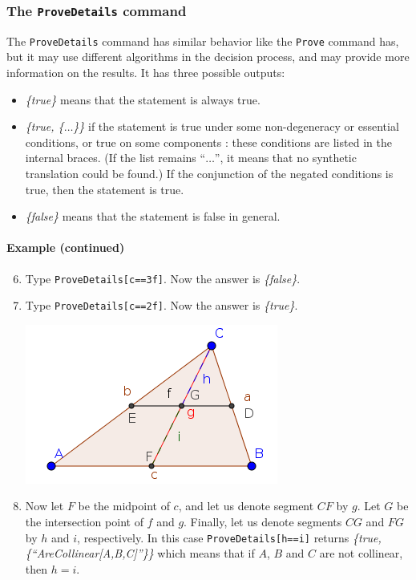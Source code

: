 \documentclass{article}
\begin{document}
\subsubsection{The \texttt{ProveDetails} command}
The \texttt{ProveDetails} command has similar behavior like the \texttt{Prove} command has, but it may use different algorithms in the decision process, and may provide more information on the results. It has three possible outputs:
\begin{itemize}
    \item \textit{\{true\}} means that the statement is always true.
    \item \textit{\{true, \{$\ldots$\}\}} if the statement is true under some non-degeneracy \cite{Chou} or essential \cite{KovacsRecioSolyomGecse} conditions, or true on some components \cite{ZhouWangSun}: these conditions are listed in the internal braces. (If the list remains ``$\ldots$'', it means that no synthetic translation could be found.)  If the conjunction of the negated conditions is true, then the statement is true.
    \item \textit{\{false\}} means that the statement is false in general.
\end{itemize}
\paragraph{Example (continued)}
\begin{enumerate}
\setcounter{enumi}{5}
    \item Type \texttt{ProveDetails[c==3f]}. Now the answer is \textit{\{false\}}.
    \item Type \texttt{ProveDetails[c==2f]}. Now the answer is \textit{\{true\}}.
\begin{center}
\includegraphics[scale=0.5]{ProveDetails-example-1}
\end{center}
    \item Now let $F$ be the midpoint of $c$, and let us denote segment $CF$ by $g$. Let $G$ be the intersection point of $f$ and $g$. Finally, let us denote segments $CG$ and $FG$ by $h$ and $i$, respectively. In this case \texttt{ProveDetails[h==i]} returns \textit{\{true,\{``AreCollinear[A,B,C]''\}\}} which means that if $A$, $B$ and $C$ are not collinear, then $h=i$.
\end{enumerate}
\end{document}
